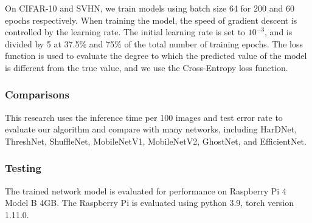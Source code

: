 \documentclass[default,iicol]{sn-jnl}
\theoremstyle{thmstyleone}\newtheorem{theorem}{Theorem}\newtheorem{proposition}[theorem]{Proposition}
\theoremstyle{thmstyletwo}\newtheorem{example}{Example}\newtheorem{remark}{Remark}
\theoremstyle{thmstylethree}\newtheorem{definition}{Definition}
\begin{document}
On CIFAR-10 and SVHN, we train models using batch size 64 for 200 and 60 epochs respectively. When training the model, the speed of gradient descent is controlled by the learning rate. The initial learning rate is set to ${10}^{-3}$, and is divided by 5 at 37.5\% and 75\% of the total number of training epochs. The loss function is used to evaluate the degree to which the predicted value of the model is different from the true value, and we use the Cross-Entropy loss function.

\subsubsection{Comparisons}
This research uses the inference time per 100 images and test error rate to evaluate our algorithm and compare with many networks, including HarDNet, ThreshNet, ShuffleNet, MobileNetV1, MobileNetV2, GhostNet, and EfficientNet.

\subsubsection{Testing}
The trained network model is evaluated for performance on Raspberry Pi 4 Model B 4GB. The Raspberry Pi is evaluated using python 3.9, torch version 1.11.0.
\end{document}
